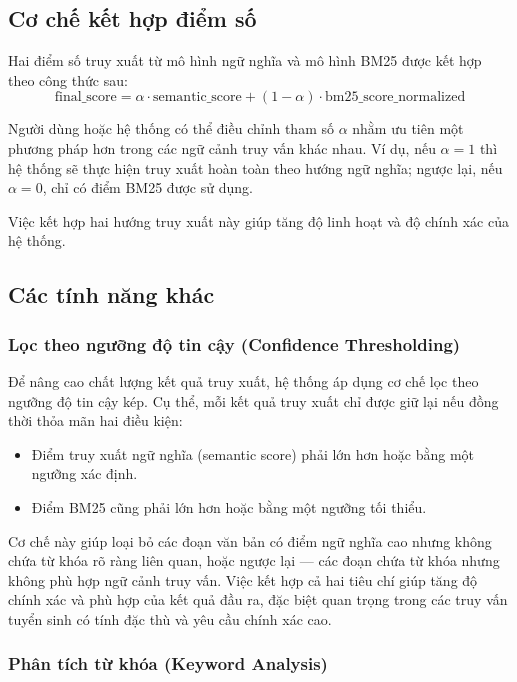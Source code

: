 \subsection{Cơ chế kết hợp điểm số}

Hai điểm số truy xuất từ mô hình ngữ nghĩa và mô hình BM25 được kết hợp theo công thức sau:
\begin{equation}
    \text{final\_score} = \alpha \cdot \text{semantic\_score} + (1 - \alpha) \cdot \text{bm25\_score\_normalized}
\end{equation}

Người dùng hoặc hệ thống có thể điều chỉnh tham số \(\alpha\) nhằm ưu tiên một phương pháp hơn trong các ngữ cảnh truy vấn khác nhau. Ví dụ, nếu \(\alpha = 1\) thì hệ thống sẽ thực hiện truy xuất hoàn toàn theo hướng ngữ nghĩa; ngược lại, nếu \(\alpha = 0\), chỉ có điểm BM25 được sử dụng.

Việc kết hợp hai hướng truy xuất này giúp tăng độ linh hoạt và độ chính xác của hệ thống.

\subsection{Các tính năng khác}

\subsubsection{Lọc theo ngưỡng độ tin cậy (Confidence Thresholding)}

Để nâng cao chất lượng kết quả truy xuất, hệ thống áp dụng cơ chế lọc theo ngưỡng độ tin cậy kép. Cụ thể, mỗi kết quả truy xuất chỉ được giữ lại nếu đồng thời thỏa mãn hai điều kiện:

\begin{itemize}
    \item Điểm truy xuất ngữ nghĩa (semantic score) phải lớn hơn hoặc bằng một ngưỡng xác định.
    \item Điểm BM25 cũng phải lớn hơn hoặc bằng một ngưỡng tối thiểu.
\end{itemize}

Cơ chế này giúp loại bỏ các đoạn văn bản có điểm ngữ nghĩa cao nhưng không chứa từ khóa rõ ràng liên quan, hoặc ngược lại — các đoạn chứa từ khóa nhưng không phù hợp ngữ cảnh truy vấn. Việc kết hợp cả hai tiêu chí giúp tăng độ chính xác và phù hợp của kết quả đầu ra, đặc biệt quan trọng trong các truy vấn tuyển sinh có tính đặc thù và yêu cầu chính xác cao.

\subsubsection{Phân tích từ khóa (Keyword Analysis)}

